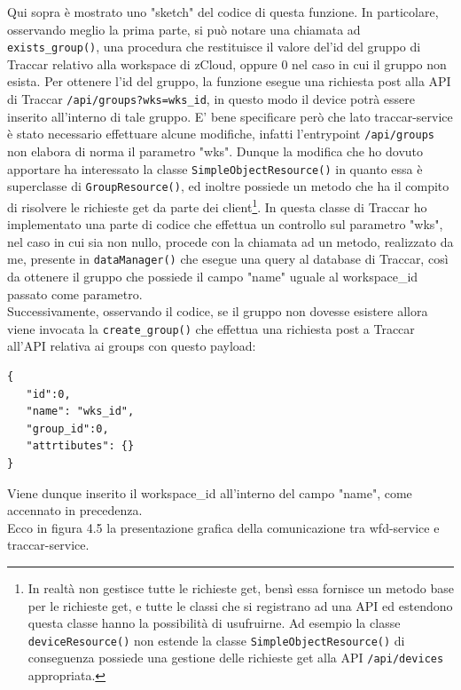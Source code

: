 \documentclass[a4paper,titlepage,12pt]{report}
\begin{document}
{\noindent Qui sopra è mostrato uno "sketch" del codice di questa funzione. In particolare, osservando meglio la prima parte, si può notare una chiamata ad \texttt{exists\_group()}, una procedura che restituisce il valore del'id del gruppo di Traccar relativo alla workspace di zCloud, oppure 0 nel caso in cui il gruppo non esista. Per ottenere l'id del gruppo, la funzione esegue una richiesta post alla API di Traccar \texttt{/api/groups?wks=wks\_id}, in questo modo il device potrà essere inserito all'interno di tale gruppo. E' bene specificare però che lato traccar-service è stato necessario effettuare alcune modifiche, infatti l'entrypoint \texttt{/api/groups} non elabora di norma il parametro "wks". Dunque la modifica che ho dovuto apportare ha interessato la classe \texttt{SimpleObjectResource()} in quanto essa è superclasse di \texttt{GroupResource()}, ed inoltre possiede un metodo che ha il compito di risolvere le richieste get da parte dei client\footnote{In realtà non gestisce tutte le richieste get, bensì essa fornisce un metodo base per le richieste get, e tutte le classi che si registrano ad una API ed estendono questa classe hanno la possibilità di usufruirne. Ad esempio la classe \texttt{deviceResource()} non estende la classe \texttt{SimpleObjectResource()} di conseguenza possiede una gestione delle richieste get alla API \texttt{/api/devices} appropriata.}. In questa classe di Traccar ho implementato una parte di codice che effettua un controllo sul parametro "wks", nel caso in cui sia non nullo, procede con la chiamata ad un metodo, realizzato da me, presente in \texttt{dataManager()} che esegue una query al database di Traccar, così da ottenere il gruppo che possiede il campo "name" uguale al workspace\_id passato come parametro. \\
Successivamente, osservando il codice, se il gruppo non dovesse esistere allora viene invocata la \texttt{create\_group()} che effettua una richiesta post a Traccar all'API relativa ai groups con questo payload:
\begin{verbatim}
{
   "id":0,
   "name": "wks_id",
   "group_id":0,
   "attrtibutes": {}
}

\end{verbatim}

\noindent Viene dunque inserito il workspace\_id all'interno del campo "name", come accennato in precedenza.\\
Ecco in figura 4.5 la presentazione grafica della comunicazione tra wfd-service e traccar-service. 

}
\end{document}
